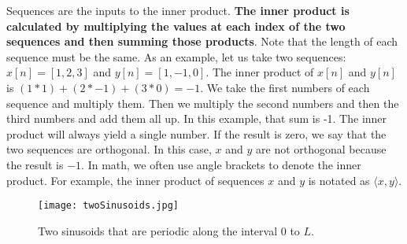 Sequences are the inputs to the inner product.  \textbf{The inner product is calculated by multiplying
the values at each index of the two sequences and then summing those products}.  Note that the length of
each sequence must be the same.  As an example, let us
take two sequences: $x[n] = [1, 2, 3]$ and $y[n] = [1, -1, 0]$.  The inner product of $x[n]$ and $y[n]$ is $(1 * 1) + (2 * -1) + (3 * 0) = -1$.
We take the first numbers of each sequence and multiply them.  Then we multiply the second
numbers and then the third numbers and add them all up.  In this example, that sum is -1.  The inner product 
will always yield a single number.  If the result is zero, we say that the two sequences are
orthogonal.  In this case, $x$ and $y$ are not orthogonal because the result is $-1$.  
In math, we often use angle brackets to denote
the inner product.  For example, the inner product of sequences $x$ and $y$ is notated as $\langle x, y \rangle$.

\begin{figure}[h]
	\caption{Two sinusoids that are periodic along the interval 0 to $L$.}
	\centering
	\texttt{[image: twoSinusoids.jpg]}
	\label{fig:twoSines}
\end{figure}



